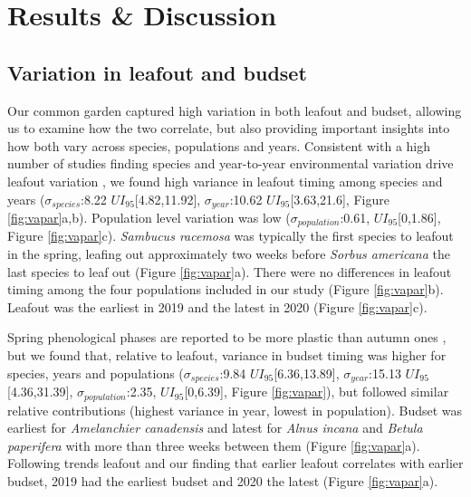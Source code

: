 \documentclass{article}[12pt]
\begin{document}
\section{Results \& Discussion} 
\subsection{Variation in leafout and budset}

Our common garden captured high variation in both leafout and budset, allowing us to examine how the two correlate, but also providing important insights into how both vary across species, populations and years. Consistent with a high number of studies finding species and year-to-year environmental variation drive leafout variation \citep{delpierre2024, donnelly2017, polgar2011}, we found high variance in leafout timing among species and years ($\sigma_{species}$:8.22 $UI_{95}$[4.82,11.92], $\sigma_{year}$:10.62 $UI_{95}$[3.63,21.6], Figure \ref{fig:vapar}a,b). Population level variation was low ($\sigma_{population}$:0.61, $UI_{95}$[0,1.86], Figure \ref{fig:vapar}c). \emph{Sambucus racemosa} was typically the first species to leafout in the spring, leafing out approximately two weeks before \emph{Sorbus americana} the last species to leaf out (Figure \ref{fig:vapar}a). There were no differences in leafout timing among the four populations included in our study (Figure \ref{fig:vapar}b). Leafout was the earliest in 2019 and the latest in 2020 (Figure \ref{fig:vapar}c). %

Spring phenological phases are reported to be more plastic than autumn ones \citep{mckown2014, aitken2016, vico2021}, but we found that, relative to leafout, variance in budset timing was higher for species, years and populations ($\sigma_{species}$:9.84 $UI_{95}$[6.36,13.89], $\sigma_{year}$:15.13 $UI_{95}$[4.36,31.39], $\sigma_{population}$:2.35, $UI_{95}$[0,6.39], Figure \ref{fig:vapar}), but followed similar relative contributions (highest variance in year, lowest in population). Budset was earliest for \emph{Amelanchier canadensis} and latest for \emph{Alnus incana} and \emph{Betula paperifera} with more than three weeks between them (Figure \ref{fig:vapar}a). Following trends leafout and our finding that earlier leafout correlates with earlier budset, 2019 had the earliest budset and 2020 the latest (Figure \ref{fig:vapar}a).
\end{document}
